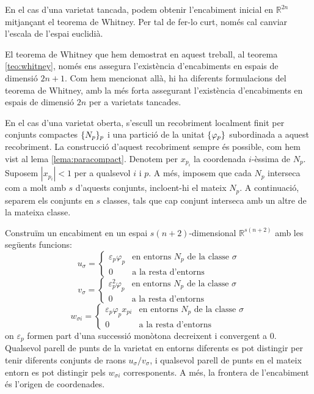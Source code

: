 En el cas d'una varietat tancada, podem obtenir l'encabiment inicial en $\mathbb R^{2n}$ mitjançant el teorema de Whitney. Per tal de fer-lo curt, només cal canviar l'escala de l'espai euclidià.

\begin{obs}
    El teorema de Whitney que hem demostrat en aquest treball, al teorema \ref{teo:whitney}, només ens assegura l'existència d'encabiments en espais de dimensió $2n+1$. Com hem mencionat allà, hi ha diferents formulacions del teorema de Whitney, amb la més forta assegurant l'existència d'encabiments en espais de dimensió $2n$ per a varietats tancades.
\end{obs}

En el cas d'una varietat oberta, s'escull un recobriment localment finit per conjunts compactes $\{N_p\}_p$ i una partició de la unitat $\{\varphi_p\}$ subordinada a aquest recobriment. La construcció d'aquest recobriment sempre és possible, com hem vist al lema \ref{lema:paracompact}. Denotem per $x_{p_i}$ la coordenada $i$-èssima de $N_p$. Suposem $|x_{p_i}|<1$ per a qualsevol $i$ i $p$. A més, imposem que cada $N_p$ interseca com a molt amb $s$ d'aquests conjunts, incloent-hi el mateix $N_p$. A continuació, separem els conjunts en $s$ classes, tals que cap conjunt interseca amb un altre de la mateixa classe. 

Construïm un encabiment en un espai $s(n+2)$-dimensional $\mathbb R^{s(n+2)}$ amb les següents funcions:
\begin{equation}
    u_\sigma = 
    \begin{cases}
        \varepsilon_p\varphi_p & \text{en entorns $N_p$ de la classe $\sigma$} \\
        0 & \text{a la resta d'entorns}
    \end{cases}
\end{equation}
\begin{equation}
    v_\sigma = 
    \begin{cases}
        \varepsilon_p^2\varphi_p & \text{en entorns $N_p$ de la classe $\sigma$} \\
        0 & \text{a la resta d'entorns}
    \end{cases}
\end{equation}
\begin{equation}
    w_{\sigma i} = 
    \begin{cases}
        \varepsilon_p\varphi_p x_{p i} & \text{en entorns $N_p$ de la classe $\sigma$} \\
        0 & \text{a la resta d'entorns}
    \end{cases}
\end{equation}
on $\varepsilon_p$ formen part d'una successió monòtona decreixent i convergent a $0$. Qualsevol parell de punts de la varietat en entorns diferents es pot distingir per tenir diferents conjunts de raons $u_\sigma/v_\sigma$, i qualsevol parell de punts en el mateix entorn es pot distingir pels $w_{\sigma i}$ corresponents. A més, la frontera de l'encabiment és l'origen de coordenades.

